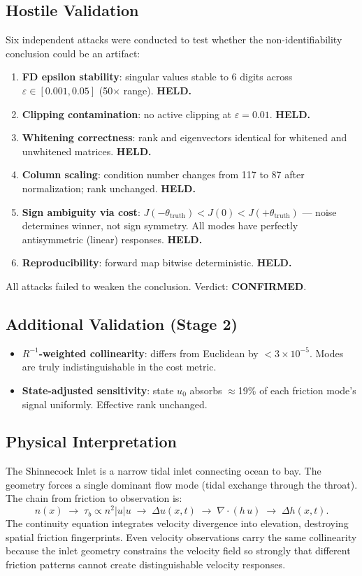 \documentclass[11pt]{article}
\begin{document}
\subsection{Hostile Validation}
Six independent attacks were conducted to test whether the non-identifiability conclusion could be an artifact:
\begin{enumerate}
\item \textbf{FD epsilon stability}: singular values stable to 6 digits across $\varepsilon \in [0.001, 0.05]$ (50$\times$ range). \textbf{HELD.}
\item \textbf{Clipping contamination}: no active clipping at $\varepsilon = 0.01$. \textbf{HELD.}
\item \textbf{Whitening correctness}: rank and eigenvectors identical for whitened and unwhitened matrices. \textbf{HELD.}
\item \textbf{Column scaling}: condition number changes from 117 to 87 after normalization; rank unchanged. \textbf{HELD.}
\item \textbf{Sign ambiguity via cost}: $J(-\theta_{\mathrm{truth}}) < J(0) < J(+\theta_{\mathrm{truth}})$ --- noise determines winner, not sign symmetry. All modes have perfectly antisymmetric (linear) responses. \textbf{HELD.}
\item \textbf{Reproducibility}: forward map bitwise deterministic. \textbf{HELD.}
\end{enumerate}
All attacks failed to weaken the conclusion. Verdict: \textbf{CONFIRMED}.

\subsection{Additional Validation (Stage 2)}
\begin{itemize}
\item \textbf{$R^{-1}$-weighted collinearity}: differs from Euclidean by $< 3\times 10^{-5}$. Modes are truly indistinguishable in the cost metric.
\item \textbf{State-adjusted sensitivity}: state $u_0$ absorbs $\approx$19\% of each friction mode's signal uniformly. Effective rank unchanged.
\end{itemize}

\subsection{Physical Interpretation}
The Shinnecock Inlet is a narrow tidal inlet connecting ocean to bay. The geometry forces a single dominant flow mode (tidal exchange through the throat). The chain from friction to observation is:
\[
n(x) \;\rightarrow\; \tau_b \propto n^2 |u| u \;\rightarrow\; \Delta u(x,t) \;\rightarrow\; \nabla\cdot(h\,u) \;\rightarrow\; \Delta h(x,t).
\]
The continuity equation integrates velocity divergence into elevation, destroying spatial friction fingerprints. Even velocity observations carry the same collinearity because the inlet geometry constrains the velocity field so strongly that different friction patterns cannot create distinguishable velocity responses.
\end{document}
